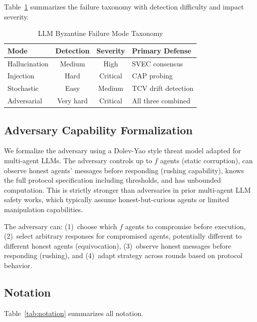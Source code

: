 \documentclass[journal,10pt]{IEEEtran}
\begin{document}
Table~\ref{tab:failure_modes} summarizes the failure taxonomy with detection difficulty and impact severity.

\begin{table}[t]
\centering
\caption{LLM Byzantine Failure Mode Taxonomy}
\label{tab:failure_modes}
\renewcommand{\arraystretch}{1.1}
\scriptsize
\begin{tabular}{@{}l c c l@{}}
\toprule
\textbf{Mode} & \textbf{Detection} & \textbf{Severity} & \textbf{Primary Defense} \\
\midrule
Hallucination & Medium & High & SVEC consensus \\
Injection & Hard & Critical & CAP probing \\
Stochastic & Easy & Medium & TCV drift detection \\
Adversarial & Very hard & Critical & All three combined \\
\bottomrule
\end{tabular}
\end{table}

\subsection{Adversary Capability Formalization}
We formalize the adversary using a Dolev-Yao style threat model adapted for multi-agent LLMs. The adversary controls up to $f$ agents (static corruption), can observe honest agents' messages before responding (rushing capability), knows the full protocol specification including thresholds, and has unbounded computation. This is strictly stronger than adversaries in prior multi-agent LLM safety works, which typically assume honest-but-curious agents or limited manipulation capabilities.

The adversary can: (1)~choose which $f$ agents to compromise before execution, (2)~select arbitrary responses for compromised agents, potentially different to different honest agents (equivocation), (3)~observe honest messages before responding (rushing), and (4)~adapt strategy across rounds based on protocol behavior.

\subsection{Notation}
Table~\ref{tab:notation} summarizes all notation.
\end{document}
